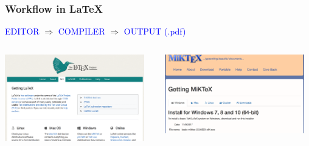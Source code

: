\documentclass[10pt]{beamer}
\newcommand{\words}{\textcolor{blue}}
\begin{document}
  
  \begin{frame}
    \frametitle{Workflow in \LaTeX}
   

\begin{center}
\words{EDITOR} $\Rightarrow$ \words{COMPILER} $\Rightarrow$ \words{OUTPUT (.pdf)} 
\end{center}
  

 \vspace{1cm}
 
\begin{columns}
        \begin{column}{0.31\textwidth}
            \includegraphics[width=0.95\textwidth]{latex-web.png}
        \end{column}
        
         \begin{column}{0.31\textwidth}
 \includegraphics[width=0.95\textwidth]{miktex.png}
        \end{column}
        

\end{columns}
\end{frame}
\end{document}

